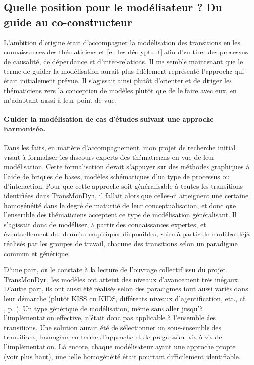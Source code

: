 \subsection[Position du modélisateur : du guide au co-constructeur]{Quelle position pour le modélisateur ? Du guide au co-constructeur \label{subsec:position-modelisateur}}

L'ambition d'origine était d'accompagner la modélisation des transitions en \og [extrayant] les connaissances des thématiciens et [en les décryptant] afin d'en tirer des processus de causalité, de dépendance et d'inter-relations\fg{}.
Il me semble maintenant que le terme de \og guider\fg{} la modélisation aurait plus fidèlement représenté l'approche qui était initialement prévue.
Il s'agissait ainsi plutôt d'orienter et de diriger les thématiciens vers la conception de modèles plutôt que de le faire avec eux, en m'adaptant aussi à leur point de vue.


\paragraph{Guider la modélisation de cas d'études suivant une approche harmonisée.}

Dans les faits, en matière d'accompagnement, mon projet de recherche initial visait à formaliser les discours experts des thématiciens en vue de leur modélisation.
Cette formalisation devait s'appuyer sur des méthodes graphiques à l'aide de \og briques de bases\fg{}, modèles schématiques d'un type de processus ou d'interaction.
Pour que cette approche soit généralisable à toutes les transitions identifiées dans TransMonDyn, il fallait alors que celles-ci atteignent une certaine homogénéité dans le degré de maturité de leur conceptualisation, et donc que l'ensemble des thématiciens acceptent ce type de modélisation généralisant.
Il s'agissait donc de modéliser, à partir des connaissances expertes, et éventuellement des données empiriques disponibles, voire à partir de modèles déjà réalisés par les groupes de travail, chacune des transitions selon un paradigme commun et générique.

D'une part, on le constate à la lecture de l'ouvrage collectif issu du projet TransMonDyn, les modèles ont atteint des niveaux d'avancement très inégaux.
D'autre part, ils ont aussi été réalisés selon des paradigmes tout aussi variés dans leur démarche (plutôt KISS ou KIDS, différents niveaux d'agentification, etc., cf. , p. \pageref{par:interdisciplinarite-methodo}).
Un type générique de modélisation, même sans aller jusqu'à l'implémentation effective, n'était donc pas applicable à l'ensemble des transitions.
Une solution aurait été de sélectionner un sous-ensemble des transitions, homogène en terme d'approche et de progression vis-à-vis de l'implémentation.
Là encore, chaque modélisateur ayant une approche propre (voir plus haut), une telle homogénéité était pourtant difficilement identifiable.

